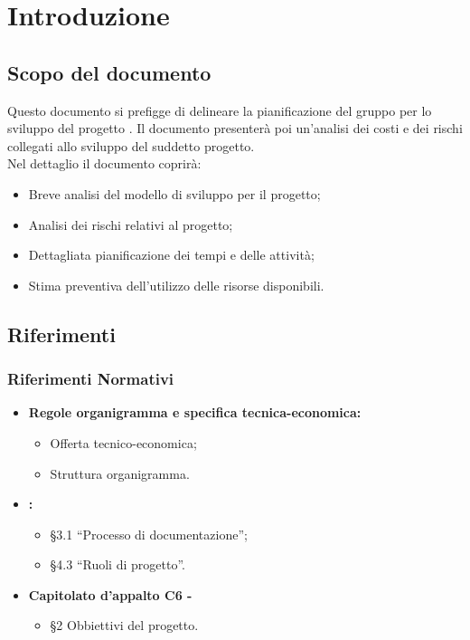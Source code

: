 \documentclass[PianoDiProgetto.tex]{subfiles}
\begin{document}
\chapter{Introduzione}

\section{Scopo del documento}
Questo documento si prefigge di delineare la pianificazione del gruppo \gruppo per lo sviluppo del progetto \progetto. Il documento presenterà poi un'analisi dei costi e dei rischi collegati allo sviluppo del suddetto progetto.\\
Nel dettaglio il documento coprirà:
\begin{itemize}
	\item Breve analisi del modello di sviluppo per il progetto;
	\item Analisi dei rischi relativi al progetto;
	\item Dettagliata pianificazione dei tempi e delle attività;
	\item Stima preventiva dell'utilizzo delle risorse disponibili.
\end{itemize}

\scopoProdotto

\glossExpl

\section{Riferimenti}
\subsection{Riferimenti Normativi}
\begin{itemize}
	\item \textbf{Regole organigramma e specifica tecnica-economica:} \\
		  \begin{itemize}
		  	\item Offerta tecnico-economica;
		  	\item Struttura organigramma.
		  \end{itemize}
	\item \textbf{\ndp \vruno:}
	 \begin{itemize}
	 	\item \S3.1 ``Processo di documentazione'';
	  	\item \S4.3 ``Ruoli di progetto''.
	 \end{itemize}
 	\item \textbf{Capitolato d'appalto C6 - \progetto}\\
 		\begin{itemize}
 			\item \S2 Obbiettivi del progetto.
 		\end{itemize}
	
\end{itemize}
\end{document}
